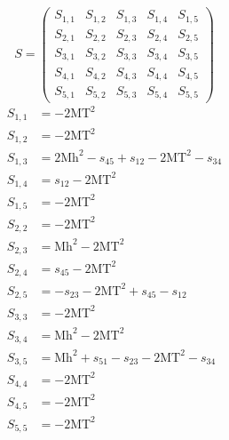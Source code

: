 \documentclass[a4paper]{article}
\begin{document}
\begin{equation}
S=\left(\begin{array}{ccccc}
   S_{1,1}&
   S_{1,2}&
   S_{1,3}&
   S_{1,4}&
   S_{1,5}\\
   S_{2,1}&
   S_{2,2}&
   S_{2,3}&
   S_{2,4}&
   S_{2,5}\\
   S_{3,1}&
   S_{3,2}&
   S_{3,3}&
   S_{3,4}&
   S_{3,5}\\
   S_{4,1}&
   S_{4,2}&
   S_{4,3}&
   S_{4,4}&
   S_{4,5}\\
   S_{5,1}&
   S_{5,2}&
   S_{5,3}&
   S_{5,4}&
   S_{5,5}\end{array}\right)
\end{equation}
\begin{subequations}
\begin{align}
   S_{1,1}&=-2\text{MT}^2\\
   S_{1,2}&=-2\text{MT}^2\\
   S_{1,3}&=2\text{Mh}^2-s_{45}+s_{12}-2\text{MT}^2-s_{34}\\
   S_{1,4}&=s_{12}-2\text{MT}^2\\
   S_{1,5}&=-2\text{MT}^2\\
   S_{2,2}&=-2\text{MT}^2\\
   S_{2,3}&=\text{Mh}^2-2\text{MT}^2\\
   S_{2,4}&=s_{45}-2\text{MT}^2\\
   S_{2,5}&=-s_{23}-2\text{MT}^2+s_{45}-s_{12}\\
   S_{3,3}&=-2\text{MT}^2\\
   S_{3,4}&=\text{Mh}^2-2\text{MT}^2\\
   S_{3,5}&=\text{Mh}^2+s_{51}-s_{23}-2\text{MT}^2-s_{34}\\
   S_{4,4}&=-2\text{MT}^2\\
   S_{4,5}&=-2\text{MT}^2\\
   S_{5,5}&=-2\text{MT}^2
\end{align}
\end{subequations}
\end{document}
